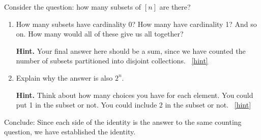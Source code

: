 \documentclass{book}
\begin{document}
\setcounter{project}{78}
\addtocounter{project}{-1}
\begin{activity}[]\label{activity-pascalrow-dc}
\hypertarget{p-607}{}%
Consider the question: how many subsets of \([n]\) are there?%
\begin{enumerate}[font=\bfseries,label=(\alph*),ref=\alph*]
\item\label{task-112} \hypertarget{p-608}{}%
How many subsets have cardinality 0?  How many have cardinality 1?  And so on.  How many would all of these give us all together?%
\par\smallskip%
\noindent\textbf{Hint.}\hypertarget{hint-34}{}\quad%
\hypertarget{p-609}{}%
Your final answer here should be a sum, since we have counted the number of subsets partitioned into disjoint collections.%
~\hfill{\tiny\hyperlink{a-78.a}{[hint]}\hypertarget{q-78.a}{}}\item\label{task-113} \hypertarget{p-610}{}%
Explain why the answer is also \(2^n\).%
\par\smallskip%
\noindent\textbf{Hint.}\hypertarget{hint-35}{}\quad%
\hypertarget{p-611}{}%
Think about how many choices you have for each element.  You could put 1 in the subset or not.  You could include \(2\) in the subset or not.%
~\hfill{\tiny\hyperlink{a-78.b}{[hint]}\hypertarget{q-78.b}{}}\end{enumerate}
\bigbreak
\hypertarget{p-612}{}%
Conclude: Since each side of the identity is the answer to the same counting question, we have established the identity.%
\end{activity}
\end{document}
